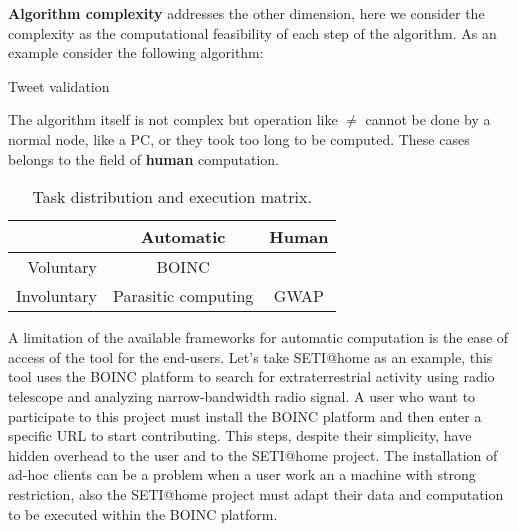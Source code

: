 \textbf{Algorithm complexity} addresses the other dimension, here we consider the
complexity as the computational feasibility of each step of the algorithm.
As an example consider the following algorithm:\\
\begin{algorithm}[H]
	\caption{Tweet validation}
	\label{alg:intro_example}

	\BlankLine

\end{algorithm}
The algorithm itself is not complex but operation like  $\ne$
cannot be done by a normal node, like a PC, or they took too long to be computed.
These cases belongs to the field of \textbf{human} computation.\\
\begin{table}[htb]
	\caption{Task distribution and execution matrix.}
	\label{tab:matrix}
	\centering
	\begin{tabular}{r|c|c}
		 & \textbf{Automatic} & \textbf{Human}\\
		\hline
		Voluntary & \acs{BOINC} & \citetitle{turk}\\
		\hline
		Involuntary & Parasitic computing & \acs{GWAP}
	\end{tabular}
\end{table}



A limitation of the available frameworks for automatic computation is the ease
of access of the tool for the end-users. Let's take \ac{SETI@home} as an example,
this tool uses the \ac{BOINC} platform to search for extraterrestrial activity
using radio telescope and analyzing narrow-bandwidth radio signal.
A user who want to participate to this project must install the \ac{BOINC}
platform and then enter a specific URL to start contributing.
This steps, despite their simplicity, have hidden overhead to the user and to
the \ac{SETI@home} project. The installation of ad-hoc clients can be a problem
when a user work an a machine with strong restriction, also the \ac{SETI@home}
project must adapt their data and computation to be executed within the \ac{BOINC}
platform.


